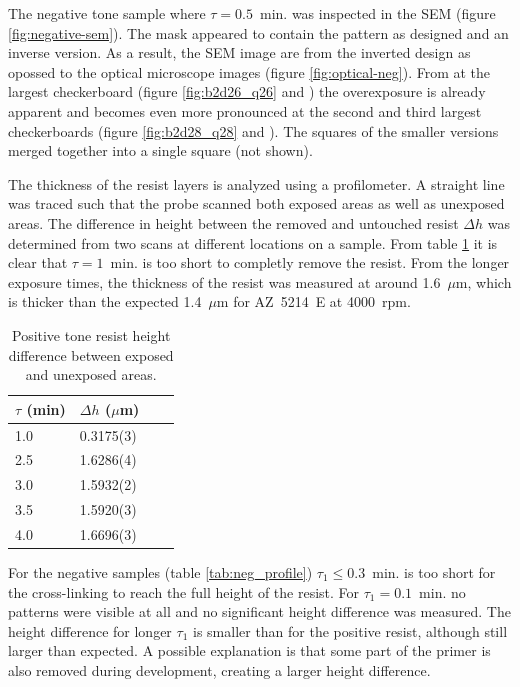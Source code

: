 The negative tone sample where $\tau = 0.5$~min. was inspected in the SEM (figure \ref{fig:negative-sem}). The mask appeared to contain the pattern as designed and an inverse version. As a result, the SEM image are from the inverted design as opossed to the optical microscope images (figure \ref{fig:optical-neg}). From at the largest checkerboard (figure \ref{fig:b2d26_q26} and ) the overexposure is already apparent and becomes even more pronounced at the second and third largest checkerboards (figure \ref{fig:b2d28_q28} and ). The squares of the smaller versions merged together into a single square (not shown).

The thickness of the resist layers is analyzed using a profilometer. A straight line was traced such that the probe scanned both exposed areas as well as  unexposed areas. The difference in height between the removed and untouched resist $\Delta h$ was determined from two scans at different locations on a sample. From table \ref{tab:pos_profile} it is clear that $\tau = 1$~min. is too short to completly remove the resist. From the longer exposure times, the thickness of the resist was measured at around 1.6~$\mu$m, which is thicker than the expected 1.4~$\mu$m for AZ~5214~E at 4000~rpm.
\begin{table}[H]
    \centering
    \caption{Positive tone resist height difference between exposed and unexposed areas.}
    \begin{tabular}{X l l l}
        $\tau$ (min)& $\Delta h$ ($\mu$m) \\
        \hline\hline
        1.0 & 0.3175(3) \\
        2.5 & 1.6286(4) \\
        3.0 & 1.5932(2) \\
        3.5 & 1.5920(3) \\
        4.0 & 1.6696(3) \\
        \hline
    \end{tabular}
    \label{tab:pos_profile}
\end{table} For the negative samples (table \ref{tab:neg_profile}) $\tau_1 \leq 0.3$~min. is too short for the cross-linking to reach the full height of the resist. For $\tau_1 = 0.1$~min. no patterns were visible at all and no significant height difference was measured. The height difference for longer $\tau_1$ is smaller than for the positive resist, although still larger than expected. A possible explanation is that some part of the primer is also removed during development, creating a larger height difference. 
